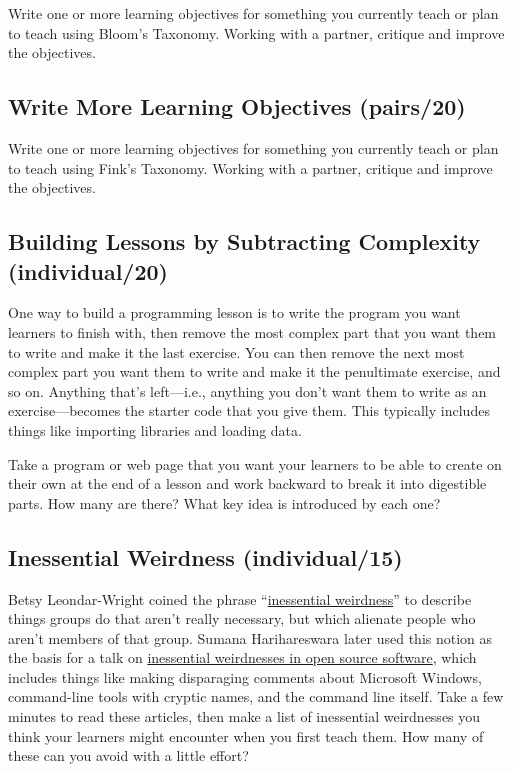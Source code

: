 Write one or more learning objectives for something you currently teach
or plan to teach using Bloom's Taxonomy. Working with a partner,
critique and improve the objectives.

\subsection{Write More Learning Objectives (pairs/20)}\label{write-more-learning-objectives-pairs20}

Write one or more learning objectives for something you currently teach
or plan to teach using Fink's Taxonomy. Working with a partner, critique
and improve the objectives.

\subsection{Building Lessons by Subtracting Complexity (individual/20)}\label{building-lessons-by-subtracting-complexity-individual20}

One way to build a programming lesson is to write the program you want
learners to finish with, then remove the most complex part that you want
them to write and make it the last exercise. You can then remove the
next most complex part you want them to write and make it the
penultimate exercise, and so on. Anything that's left---i.e., anything you
don't want them to write as an exercise---becomes the starter code that
you give them. This typically includes things like importing libraries
and loading data.

Take a program or web page that you want your learners to be able to
create on their own at the end of a lesson and work backward to break it
into digestible parts. How many are there? What key idea is introduced
by each one?

\subsection{Inessential Weirdness (individual/15)}\label{inessential-weirdness-individual15}

Betsy Leondar-Wright coined the phrase ``\href{http://www.classmatters.org/2006_07/its-not-them.php}{inessential
weirdness}'' to describe things groups do that
aren't really necessary, but which alienate people who aren't members
of that group. Sumana Harihareswara later used this notion as the
basis for a talk on \href{https://www.harihareswara.net/sumana/2016/05/21/0}{inessential weirdnesses in open source
software}, which includes things
like making disparaging comments about Microsoft Windows, command-line
tools with cryptic names, and the command line itself. Take a few
minutes to read these articles, then make a list of inessential
weirdnesses you think your learners might encounter when you first
teach them. How many of these can you avoid with a little effort?

